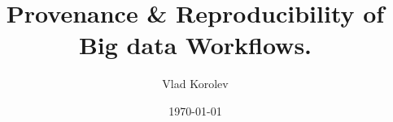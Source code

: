 \documentclass{beamer}
\title{Provenance \& Reproducibility of Big data Workflows.}
\author{Vlad Korolev}
\date[]{ \today}
\begin{document}
{
\begin{frame}
  \titlepage
\end{frame}
}





\end{document}
